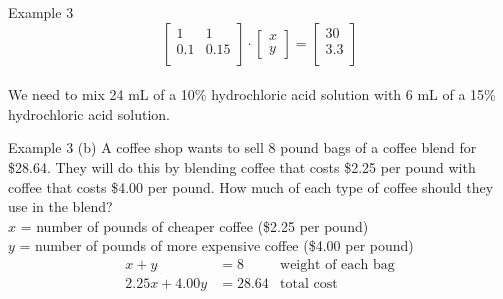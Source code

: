 \documentclass[t]{beamer}
\begin{document}
\begin{frame}{Example 3}
\[
\begin{bmatrix}
1	&	1	\\
0.1	&	0.15	\\
\end{bmatrix}
\cdot 
\begin{bmatrix}
x \\ y 
\end{bmatrix}
= \begin{bmatrix}
30 \\ 3.3 \\
\end{bmatrix}
\]
\vspace{6pt}
\newline\\ \pause
We need to mix 24 mL of a 10\% hydrochloric acid solution with 6 mL of a 15\% hydrochloric acid solution.
\end{frame}

\begin{frame}{Example 3}
(b) \quad A coffee shop wants to sell 8 pound bags of a coffee blend for \$28.64. They will do this by blending coffee that costs \$2.25 per pound with coffee that costs \$4.00 per pound. How much of each type of coffee should they use in the blend?	\newline\\	\pause
$x$ = number of pounds of cheaper coffee (\$2.25 per pound) \\
$y$ = number of pounds of more expensive coffee (\$4.00 per pound) \pause
\begin{align*}
x + y &= 8  &\text{weight of each bag} \\
2.25x + 4.00y &= 28.64 &\text{total cost} \\
\end{align*}
\end{frame}
\end{document}
